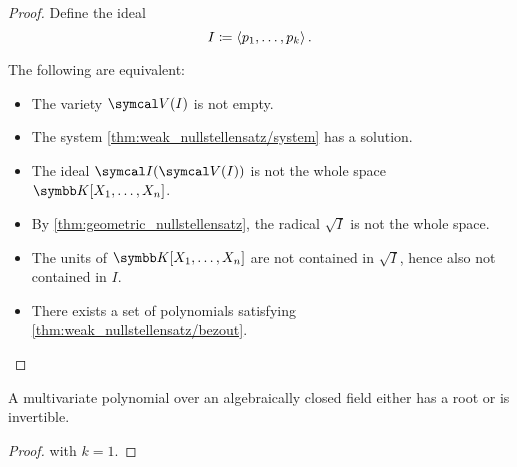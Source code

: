 \begin{proof}
  Define the ideal
  \begin{equation*}
    I \coloneqq \left\langle p_1, \ldots, p_k \right\rangle.
  \end{equation*}

  The following are equivalent:
  \begin{itemize}
    \item The variety \( \Cal{V}(I) \) is not empty.
    \item The system \cref{thm:weak_nullstellensatz/system} has a solution.
    \item The ideal \( \Cal{I}(\Cal{V}(I)) \) is not the whole space \( \K[X_1, \ldots, X_n] \).
    \item By \cref{thm:geometric_nullstellensatz}, the radical \( \sqrt I \) is not the whole space.
    \item The units of \( \K[X_1, \ldots, X_n] \) are not contained in \( \sqrt I \), hence also not contained in \( I \).
    \item There exists a set of polynomials satisfying \cref{thm:weak_nullstellensatz/bezout}.
  \end{itemize}
\end{proof}

\begin{corollary}\label{thm:polynomial_over_closed_field_is_either_invertible_or_has_root}
  A multivariate polynomial over an algebraically closed field either has a root or is invertible.
\end{corollary}
\begin{proof}
   with \( k = 1 \).
\end{proof}
